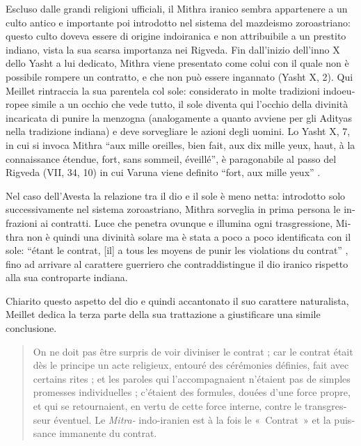 \documentclass[french,output=paper,colorlinks,citecolor=brown]{../langscibook}
\begin{document}
\begin{otherlanguage}{italian}
Escluso dalle grandi religioni ufficiali, il Mithra iranico sembra appartenere a un culto antico e importante poi introdotto nel sistema del mazdeismo zoroastriano: questo culto doveva essere di origine indoiranica e non attribuibile a un prestito indiano, vista la sua scarsa importanza nei Rigveda. 
Fin dall'inizio dell’inno X dello Yasht a lui dedicato, Mithra viene presentato come colui con il quale non è possibile rompere un contratto, e che non può essere ingannato (Yasht X, 2). Qui Meillet rintraccia la sua parentela col sole: considerato in molte tradizioni indoeuropee simile a un occhio che vede tutto, il sole diventa qui l’occhio della divinità incaricata di punire la menzogna (analogamente a quanto avviene per gli Adityas nella tradizione indiana) e deve sorvegliare le azioni degli uomini. Lo Yasht X, 7, in cui si invoca Mithra “aux mille oreilles, bien fait, aux dix mille yeux, haut, à la connaissance étendue, fort, sans sommeil, éveillé”, è paragonabile al passo del Rigveda (VII, 34, 10) in cui Varuna viene definito “fort, aux mille yeux” \citep[150]{Meillet1907}.

Nel caso dell’Avesta la relazione tra il dio e il sole è meno netta: introdotto solo successivamente nel sistema zoroastriano, Mithra sorveglia in prima persona le infrazioni ai contratti. Luce che penetra ovunque e illumina ogni trasgressione, Mithra non è quindi una divinità solare ma è stata a poco a poco identificata con il sole: “étant le contrat, [il] a tous les moyens de punir les violations du contrat” \citep[153]{Meillet1907}, fino ad arrivare al carattere guerriero che contraddistingue il dio iranico rispetto alla sua controparte indiana.

Chiarito questo aspetto del dio e quindi accantonato il suo carattere naturalista, Meillet dedica la terza parte della sua trattazione a giustificare una simile conclusione. 

\begin{quote}
    On ne doit pas être surpris de voir diviniser le contrat ; car le contrat était dès le principe un acte religieux, entouré des cérémonies définies, fait avec certains rites ; et les paroles qui l’accompagnaient n’étaient pas de simples promesses individuelles ; c’étaient des formules, douées d’une force propre, et qui se retournaient, en vertu de cette force interne, contre le transgresseur éventuel. Le \textit{Mitra-} indo-iranien est à la fois le «~Contrat~» et la puissance immanente du contrat. \citep[156]{Meillet1907}
\end{quote}


\end{otherlanguage}
\end{document}

